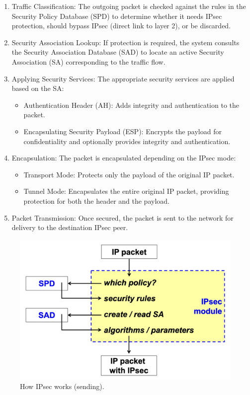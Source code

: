 \begin{enumerate}
    \item Traffic Classification: The outgoing packet is checked against the rules in the Security Policy Database (SPD) to determine whether it needs IPsec protection, should bypass IPsec (direct link to layer 2), or be discarded.
    \item Security Association Lookup: If protection is required, the system consults the Security Association Database (SAD) to locate an active Security Association (SA) corresponding to the traffic flow.
    \item Applying Security Services: The appropriate security services are applied based on the SA:
    \begin{itemize}
        \item Authentication Header (AH): Adds integrity and authentication to the packet.
        \item Encapsulating Security Payload (ESP): Encrypts the payload for confidentiality and optionally provides integrity and authentication.
    \end{itemize}
    \item Encapsulation: The packet is encapsulated depending on the IPsec mode:
    \begin{itemize}
        \item Transport Mode: Protects only the payload of the original IP packet.
        \item Tunnel Mode: Encapsulates the entire original IP packet, providing protection for both the header and the payload.
    \end{itemize}
    \item Packet Transmission: Once secured, the packet is sent to the network for delivery to the destination IPsec peer.
\end{enumerate}

\begin{figure}[H]
    \includegraphics[width=\linewidth]{Images/NetSec/ipsect_sending.png}
    \caption{How IPsec works (sending).}
    \label{fig:IPsec_packet_sending}
\end{figure}

